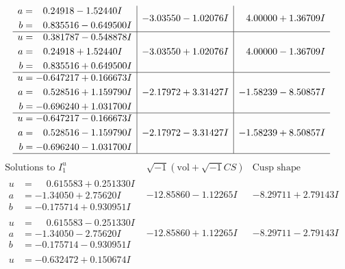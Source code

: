 \documentclass[1p]{elsarticle_modified}
\theoremstyle{definition}
\newcommand{\I}{\sqrt{-1}}
\begin{document}
$$\begin{array}{c|c|c}
\begin{aligned}
a &= \phantom{-}0.24918 - 1.52440 I \\
b &= \phantom{-}0.835516 - 0.649500 I\end{aligned}
 & -3.03550 - 1.02076 I & \phantom{-}4.00000 + 1.36709 I \\ \hline\begin{aligned}
u &= \phantom{-}0.381787 - 0.548878 I \\
a &= \phantom{-}0.24918 + 1.52440 I \\
b &= \phantom{-}0.835516 + 0.649500 I\end{aligned}
 & -3.03550 + 1.02076 I & \phantom{-}4.00000 - 1.36709 I \\ \hline\begin{aligned}
u &= -0.647217 + 0.166673 I \\
a &= \phantom{-}0.528516 + 1.159790 I \\
b &= -0.696240 + 1.031700 I\end{aligned}
 & -2.17972 + 3.31427 I & -1.58239 - 8.50857 I \\ \hline\begin{aligned}
u &= -0.647217 - 0.166673 I \\
a &= \phantom{-}0.528516 - 1.159790 I \\
b &= -0.696240 - 1.031700 I\end{aligned}
 & -2.17972 - 3.31427 I & -1.58239 + 8.50857 I\\
 \hline 
 \end{array}$$\newpage$$\begin{array}{c|c|c}  
\text{Solutions to }I^u_{1}& \I (\text{vol} + \sqrt{-1}CS) & \text{Cusp shape}\\
 \hline 
\begin{aligned}
u &= \phantom{-}0.615583 + 0.251330 I \\
a &= -1.34050 + 2.75620 I \\
b &= -0.175714 + 0.930951 I\end{aligned}
 & -12.85860 - 1.12265 I & -8.29711 + 2.79143 I \\ \hline\begin{aligned}
u &= \phantom{-}0.615583 - 0.251330 I \\
a &= -1.34050 - 2.75620 I \\
b &= -0.175714 - 0.930951 I\end{aligned}
 & -12.85860 + 1.12265 I & -8.29711 - 2.79143 I \\ \hline\begin{aligned}
u &= -0.632472 + 0.150674 I \\

\end{aligned}
\end{array}$$
\end{document}
